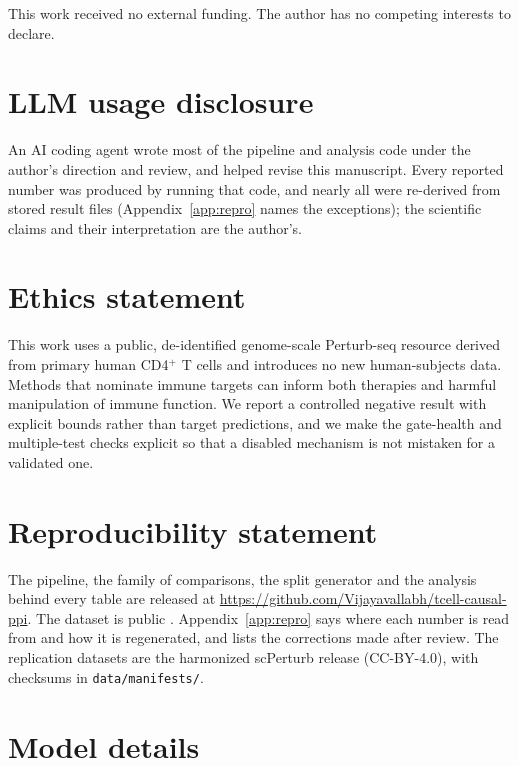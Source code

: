 \documentclass{article}
\begin{document}
\begin{ack}
This work received no external funding. The author has no competing interests to declare.
\end{ack}




\section*{LLM usage disclosure}

An AI coding agent wrote most of the pipeline and analysis code under the author's direction and review, and helped revise this manuscript. Every reported number was produced by running that code, and nearly all were re-derived from stored result files (Appendix~\ref{app:repro} names the exceptions); the scientific claims and their interpretation are the author's.

\section*{Ethics statement}

This work uses a public, de-identified genome-scale Perturb-seq resource derived from primary human CD4$^{+}$ T cells and introduces no new human-subjects data. Methods that nominate immune targets can inform both therapies and harmful manipulation of immune function. We report a controlled negative result with explicit bounds rather than target predictions, and we make the gate-health and multiple-test checks explicit so that a disabled mechanism is not mistaken for a validated one.

\section*{Reproducibility statement}

The pipeline, the family of comparisons, the split generator and the analysis behind every table are released at \url{https://github.com/Vijayavallabh/tcell-causal-ppi}. The dataset is public \citep{zhu2025gwperturbseq}. Appendix~\ref{app:repro} says where each number is read from and how it is regenerated, and lists the corrections made after review. The replication datasets are the harmonized scPerturb release \citep{peidli2024scperturb} (CC-BY-4.0), with checksums in \texttt{data/manifests/}.


\appendix

\section{Model details}
\label{app:arch}
\end{document}
